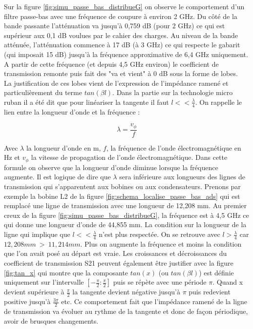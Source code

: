 \documentclass[french]{article}
\begin{document}
Sur la figure \ref{fig:simu_passe_bas_distribueG} on observe le comportement d'un filtre passe-bas avec une fréquence de coupure à environ 2 GHz. Du côté de la bande passante l'atténuation va jusqu'à 0,759 dB (pour 2 GHz) ce qui est supérieur aux 0,1 dB voulues par le cahier des charges. Au niveau de la bande atténuée, l'atténuation commence à 17 dB (à 3 GHz) ce qui respecte le gabarit (qui imposait 15 dB) jusqu'à la fréquence approximative de 6,4 GHz uniquement. A partir de cette fréquence (et depuis 4,5 GHz environ) le coefficient de transmission remonte puis fait des "va et vient" à 0 dB sous la forme de lobes.\\


La justification de ces lobes vient de l'expression de l'impédance ramené et particulièrement du terme $tan(\beta l)$. Dans la partie sur la technologie micro ruban il a été dit que pour linéariser la tangente il faut $l << \frac{\lambda}{4}$. On rappelle le lien entre la longueur d'onde et la fréquence :

\begin{equation}
	\lambda = \frac{v_\phi}{f}
\end{equation}

Avec $\lambda$ la longueur d'onde en m, $f$, la fréquence de l'onde électromagnétique en Hz et $v_\phi$ la vitesse de propagation de l'onde électromagnétique. Dans cette formule on observe que la longueur d'onde diminue lorsque la fréquence augmente. Il est logique de dire que $\lambda$ sera inférieure aux longueurs des lignes de transmission qui s'apparentent aux bobines ou aux condensateurs. Prenons par exemple la bobine L2 de la figure \ref{fig:schema_localise_passe_bas_ads} qui est remplacé une ligne de transmission avec une longueur de 12,208 mm. Au premier creux de la figure \ref{fig:simu_passe_bas_distribueG}, la fréquence est à 4,5 GHz ce qui donne une longueur d'onde de 44,855 mm. La condition sur la longueur de la ligne qui implique que $l << \frac{\lambda}{4}$ n'est plus respectée. On se retrouve avec $l > \frac{\lambda}{4}$ car $12,208 mm\ >\ 11,214 mm$. Plus on augmente la fréquence et moins la condition que l'on avait posé au départ est vraie. Les croissances et décroissances du coefficient de transmission S21 peuvent également être justifier avec la figure \ref{fig:tan_x} qui montre que la composante $tan(x)$ (ou $tan(\beta l)$) est définie uniquement sur l'intervalle $[-\frac{\pi}{2}: \frac{\pi}{2}]$ puis se répète avec une période $\pi$. Quand x devient supérieure à $\frac{\pi}{2}$ la tangente devient négative jusqu'à $\pi$ puis redevient positive jusqu'à $\frac{3 \pi}{2}$ etc. Ce comportement fait que l'impédance ramené de la ligne de transmission va évoluer au rythme de la tangente et donc de façon périodique, avoir de brusques changements.
\end{document}
